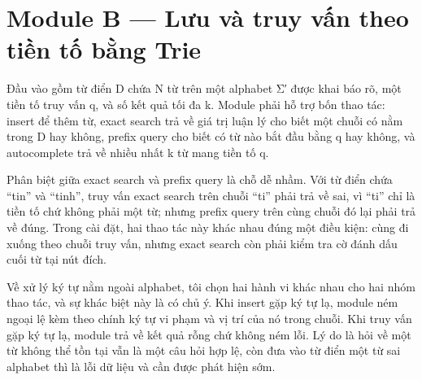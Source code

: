 \section{Module B --- Lưu và truy vấn theo tiền tố bằng Trie}
\label{sec:1-3}

Đầu vào gồm từ điển D chứa N từ trên một alphabet Σ′ được khai báo rõ,
một tiền tố truy vấn q, và số kết quả tối đa k. Module phải hỗ trợ bốn
thao tác: insert để thêm từ, exact search trả về giá trị luận lý cho
biết một chuỗi có nằm trong D hay không, prefix query cho biết có từ nào
bắt đầu bằng q hay không, và autocomplete trả về nhiều nhất k từ mang
tiền tố q.

Phân biệt giữa exact search và prefix query là chỗ dễ nhầm. Với từ điển
chứa ``tin'' và ``tinh'', truy vấn exact search trên chuỗi ``ti'' phải
trả về sai, vì ``ti'' chỉ là tiền tố chứ không phải một từ; nhưng prefix
query trên cùng chuỗi đó lại phải trả về đúng. Trong cài đặt, hai thao
tác này khác nhau đúng một điều kiện: cùng đi xuống theo chuỗi truy vấn,
nhưng exact search còn phải kiểm tra cờ đánh dấu cuối từ tại nút đích.

Về xử lý ký tự nằm ngoài alphabet, tôi chọn hai hành vi khác nhau cho
hai nhóm thao tác, và sự khác biệt này là có chủ ý. Khi insert gặp ký tự
lạ, module ném ngoại lệ kèm theo chính ký tự vi phạm và vị trí của nó
trong chuỗi. Khi truy vấn gặp ký tự lạ, module trả về kết quả rỗng chứ
không ném lỗi. Lý do là hỏi về một từ không thể tồn tại vẫn là một câu
hỏi hợp lệ, còn đưa vào từ điển một từ sai alphabet thì là lỗi dữ liệu
và cần được phát hiện sớm.

\begin{center}
\end{center}


